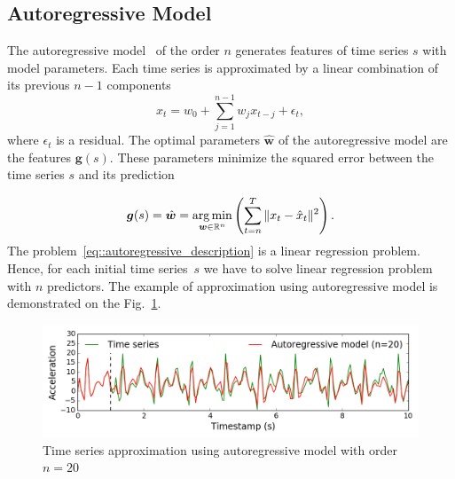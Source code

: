 \subsection{Autoregressive Model}
The autoregressive model~\cite{lukashin2003adaptive} of the order $n$ generates features of time series $s$ with model parameters. 
Each time series is approximated by a linear combination of its previous $n-1$ components 
\begin{equation*}
x_t = w_0 + \sum_{j=1}^{n-1} w_j x_{t-j} + \epsilon_t,
\end{equation*}
where $\epsilon_t$ is a residual. 
The optimal parameters $\hat{\bm{w}}$ of the autoregressive model are the features $\bm{g}(s)$.
These parameters minimize the squared error between the time series $s$ and its prediction

\begin{equation}
\bm{g}(s) = \hat{\bm{w}} = \operatorname*{arg\,min}_{\bm{w} \in \mathbb{R}^{n}} \left( \sum_{t=n}^{T} \|x_t - \hat{x}_t\|^2\right).
\label{eq::autoregressive_description}
\end{equation}
The problem~\eqref{eq::autoregressive_description} is a linear regression problem. Hence, for each initial time series~$s$ we have to solve linear regression problem with $n$ predictors.
The example of approximation using autoregressive model is demonstrated on the Fig.~\ref{fig::ar_example}.

\begin{figure}[h]
	\centering
	\includegraphics[width=1\linewidth]{pics/Fig1.png}
	\caption{Time series approximation using autoregressive model with order $n = 20$}
	\label{fig::ar_example}
\end{figure}

